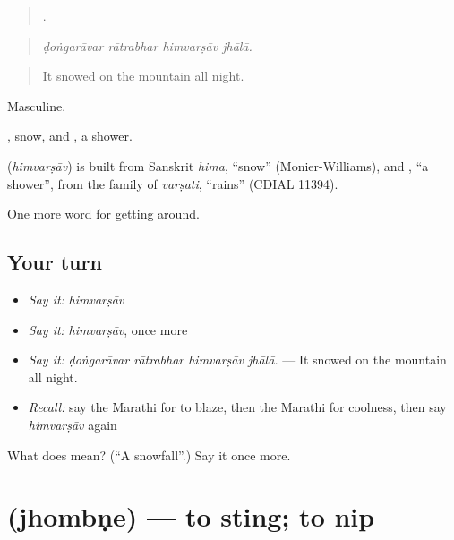 \begin{quote}
   .
\end{quote}

\begin{quote}
\emph{ḍoṅgarāvar rātrabhar himvarṣāv jhālā.}
\end{quote}

\begin{quote}
It snowed on the mountain all night.
\end{quote}

Masculine.

, snow, and , a shower.

\begin{cousinweb}
\textbf{} (\emph{himvarṣāv}) is built from Sanskrit \emph{hima}, \textquotedblleft{}snow\textquotedblright{} (Monier-Williams), and \textbf{}, \textquotedblleft{}a shower\textquotedblright{}, from the family of \emph{varṣati}, \textquotedblleft{}rains\textquotedblright{} (CDIAL 11394).
\end{cousinweb}

\begin{grammarlens}[title={What you've built}]
One more word for getting around.
\end{grammarlens}

\subsection*{Your turn}
\begin{itemize}
\raggedright
  \item \emph{Say it:} \emph{himvarṣāv}
  \item \emph{Say it:} \emph{himvarṣāv}, once more
  \item \emph{Say it:} \emph{ḍoṅgarāvar rātrabhar himvarṣāv jhālā.} — It snowed on the mountain all night.
  \item \emph{Recall:} say the Marathi for to blaze, then the Marathi for coolness, then say \emph{himvarṣāv} again
\end{itemize}

\begin{tcolorbox}[breakable,colback=teal!4,colframe=teal!35!black,title={Before you move on}]
What does  mean? (\textquotedblleft{}A snowfall\textquotedblright{}.) Say it once more.
\end{tcolorbox}
\section[\texorpdfstring{\mr{झोंबणे} (jhombṇe)}{झोंबणे (jhombṇe)}]{ (jhombṇe) — to sting; to nip}

